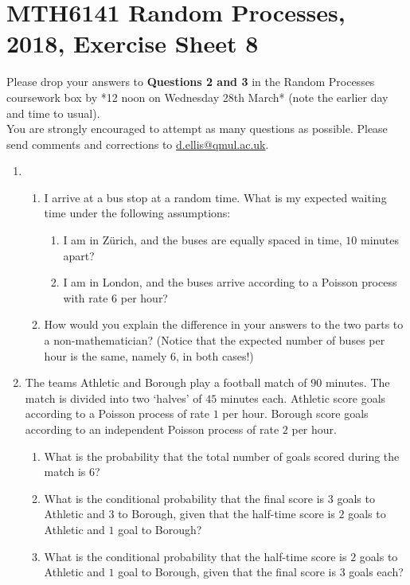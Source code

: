 \documentclass[11pt,a4paper]{article}
\begin{document}
    \section*{MTH6141 Random Processes, 2018, Exercise Sheet 8}
    Please drop your answers to \textbf{Questions 2 and 3} in the Random Processes coursework box by *12 noon on Wednesday 28th March* (note the earlier day and time to usual).\\
    You are strongly encouraged to attempt as many questions as possible. Please send comments and corrections to \href{d.ellis@qmul.ac.uk}{d.ellis@qmul.ac.uk}.
    \begin{enumerate}
        \item 
        \begin{enumerate}
            \item I arrive at a bus stop at a random time. What is my expected waiting time under the following assumptions:
            \begin{enumerate}
                \item I am in Z\"{u}rich, and the buses are equally spaced in time, $10$ minutes apart?
                \item  I am in London, and the buses arrive according to a Poisson process with rate $6$ per hour?
            \end{enumerate}
            \item How would you explain the difference in your answers to the two parts to a non-mathematician? (Notice that the expected number of buses per hour is the same, namely $6$, in both cases!)
        \end{enumerate}
        \item  The teams Athletic and Borough play a football match of $90$ minutes. The match is divided into two ‘halves’ of $45$ minutes each. Athletic score goals according to a Poisson process of rate $1$ per hour. Borough score goals according to an independent Poisson process of rate $2$ per hour.
        \begin{enumerate}
            \item  What is the probability that the total number of goals scored during the match is $6$?
            \item What is the conditional probability that the final score is $3$ goals to Athletic and $3$ to Borough, given that the half-time score is $2$ goals to Athletic and $1$ goal to Borough?
            \item What is the conditional probability that the half-time score is $2$ goals to Athletic and $1$ goal to Borough, given that the final score is $3$ goals each?

\end{enumerate}
\end{enumerate}
\end{document}
